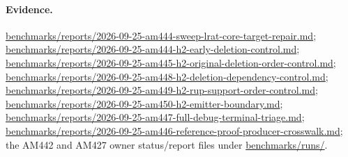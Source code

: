 \documentclass[11pt]{article}
\begin{document}
\paragraph{Evidence.}
\url{benchmarks/reports/2026-09-25-am444-sweep-lrat-core-target-repair.md};
\url{benchmarks/reports/2026-09-25-am444-h2-early-deletion-control.md};
\url{benchmarks/reports/2026-09-25-am445-h2-original-deletion-order-control.md};
\url{benchmarks/reports/2026-09-25-am448-h2-deletion-dependency-control.md};
\url{benchmarks/reports/2026-09-25-am449-h2-rup-support-order-control.md};
\url{benchmarks/reports/2026-09-25-am450-h2-emitter-boundary.md};
\url{benchmarks/reports/2026-09-25-am447-full-debug-terminal-triage.md};
\url{benchmarks/reports/2026-09-25-am446-reference-proof-producer-crosswalk.md};
the AM442 and AM427 owner status/report files under \url{benchmarks/runs/}.
\end{document}
